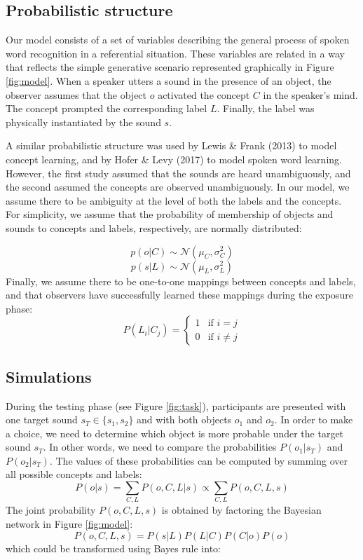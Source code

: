 \documentclass[10pt, letterpaper]{article}
\begin{document}
\subsection{Probabilistic structure}\label{probabilistic-structure}

Our model consists of a set of variables describing the general process
of spoken word recognition in a referential situation. These variables
are related in a way that reflects the simple generative scenario
represented graphically in Figure \ref{fig:model}. When a speaker utters
a sound in the presence of an object, the observer assumes that the
object \(o\) activated the concept \(C\) in the speaker's mind. The
concept prompted the corresponding label \(L\). Finally, the label was
physically instantiated by the sound \(s\).

A similar probabilistic structure was used by Lewis \& Frank (2013) to
model concept learning, and by Hofer \& Levy (2017) to model spoken word
learning. However, the first study assumed that the sounds are heard
unambiguously, and the second assumed the concepts are observed
unambiguously. In our model, we assume there to be ambiguity at the
level of both the labels and the concepts. For simplicity, we assume
that the probability of membership of objects and sounds to concepts and
labels, respectively, are normally distributed:

\[ p(o | C) \sim  \mathcal{N}(\mu_C, \sigma^2_C) \]
\[ p(s| L) \sim  \mathcal{N}(\mu_L, \sigma^2_L) \] Finally, we assume
there to be one-to-one mappings between concepts and labels, and that
observers have successfully learned these mappings during the exposure
phase: \[
P(L_i|C_j) = 
\begin{cases}
  1 & \text{if  }  i=j \\  
  0  & \text{if  }  i\neq j 
\end{cases}
\]

\subsection{Simulations}\label{simulations}

During the testing phase (see Figure \ref{fig:task}), participants are
presented with one target sound \(s_T \in\{s_1, s_2\}\) and with both
objects \(o_1\) and \(o_2\). In order to make a choice, we need to
determine which object is more probable under the target sound \(s_T\).
In other words, we need to compare the probabilities \(P(o_1|s_T)\) and
\(P(o_2|s_T)\). The values of these probabilities can be computed by
summing over all possible concepts and labels:
\[P(o|s)=\sum_{C,L} P(o, C, L| s) \propto \sum_{C,L} P(o, C, L, s) \]
The joint probability \(P(o, C, L, s)\) is obtained by factoring the
Bayesian network in Figure \ref{fig:model}:
\[P(o,C,L,s) = P(s|L)P(L|C)P(C|o)P(o) \] which could be transformed
using Bayes rule into:
\end{document}
